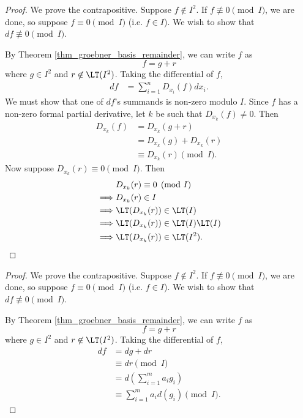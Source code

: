 \begin{proof}
  We prove the contrapositive.
  Suppose $f \not\in I^2$.
  If $f \not\equiv 0 \pmod I$, we are done, so suppose $f \equiv 0 \pmod I$ (i.e. $f \in I$).
  We wish to show that $df \not\equiv 0 \pmod I$.

  By Theorem \ref{thm_groebner_basis_remainder}, we can write $f$ as
  \[ f = g + r \]
  where $g \in I^2$ and $r \not\in \LT(I^2)$.
  Taking the differential of $f$,
  \begin{align*}
    df &= \sum_{i=1}^n D_{x_i}(f)dx_i.%
  \end{align*}
  We must show that one of $df$'s summands is non-zero modulo $I$.
  Since $f$ has a non-zero formal partial derivative, let $k$ be such that $D_{x_k}(f) \neq 0$.
  Then
  \begin{align*}
    D_{x_k}(f)
      &= D_{x_k}(g + r) \\
      &= D_{x_k}(g) + D_{x_k}(r) \\
      &\equiv D_{x_k}(r) \pmod I.
  \end{align*}
  Now suppose $D_{x_k}(r) \equiv 0 \pmod I$. Then
  \begin{align*}
    & D_{x_k}(r) \equiv 0 \pmod I \\
    \implies & D_{x_k}(r) \in I \\
    \implies & \LT(D_{x_k}(r)) \in \LT(I) \\
    \implies & \LT(D_{x_k}(r)) \in \LT(I)\LT(I) \\
    \implies & \LT(D_{x_k}(r)) \in \LT(I^2).
  \end{align*}
\end{proof}

\begin{proof}
  We prove the contrapositive.
  Suppose $f \not\in I^2$.
  If $f \not\equiv 0 \pmod I$, we are done, so suppose $f \equiv 0 \pmod I$ (i.e. $f \in I$).
  We wish to show that $df \not\equiv 0 \pmod I$.

  By Theorem \ref{thm_groebner_basis_remainder}, we can write $f$ as
  \[ f = g + r \]
  where $g \in I^2$ and $r \not\in \LT(I^2)$.
  Taking the differential of $f$,
  \begin{align*}
    df &= dg + dr \\
       &\equiv dr \pmod I \\
       &= d\left(\sum_{i=1}^m a_ig_i \right) \\
       &\equiv \sum_{i=1}^m a_id(g_i) \pmod I.
  \end{align*}
\end{proof}
